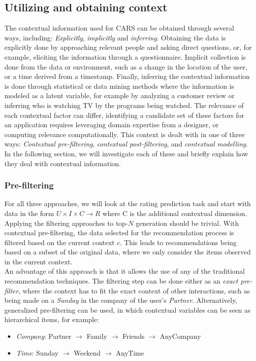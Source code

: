 \subsection{Utilizing and obtaining context}\label{subsec:utilizingandobtainingcontext}
The contextual information used for CARS can be obtained through several ways, including: \textit{Explicitly}, \textit{implicitly} and \textit{inferring}\cite{RecommenderHandbook2015}.
Obtaining the data is explicitly done by approaching relevant people and asking direct questions, or, for example, eliciting the information through a questionnaire.
Implicit collection is done from the data or environment, such as a change in the location of the user, or a time derived from a timestamp.
Finally, inferring the contextual information is done through statistical or data mining methods where the information is modeled as a latent variable, for example by analyzing a customer review or inferring who is watching TV by the programs being watched.
The relevance of each contextual factor can differ, identifying a candidate set of these factors for an application requires leveraging domain expertise from a designer, or computing relevance computationally.
This context is dealt with in one of three ways\cite{Adomavicius2011}: \textit{Contextual pre-filtering}, \textit{contextual post-filtering}, and \textit{contextual modelling}.
In the following section, we will investigate each of these and briefly explain how they deal with contextual information.

\subsubsection*{Pre-filtering}
For all three approaches, we will look at the rating prediction task and start with data in the form $U \times I \times C \rightarrow R$ where C is the additional contextual dimension.\\
Applying the filtering approaches to top-$N$ generation should be trivial.
With contextual pre-filtering, the data selected for the recommendation process is filtered based on the current context $c$.
This leads to recommendations being based on a subset of the original data, where we only consider the items observed in the current context.\\
An advantage of this approach is that it allows the use of any of the traditional recommendation techniques\cite{Adomavicius2011}.
The filtering step can be done either as an \textit{exact pre-filter}, where the context has to fit the exact context of other interactions, such as being made on a \textit{Sunday} in the company of the user's \textit{Partner}.
Alternatively, generalized pre-filtering can be used\cite{Adomavicius2011}, in which contextual variables can be seen as hierarchical items, for example:
\begin{itemize}
	\item \textit{Company}: Partner $\rightarrow$ Family $\rightarrow$ Friends $\rightarrow$ AnyCompany
	\item \textit{Time}: Sunday $\rightarrow$ Weekend $\rightarrow$ AnyTime
\end{itemize}

